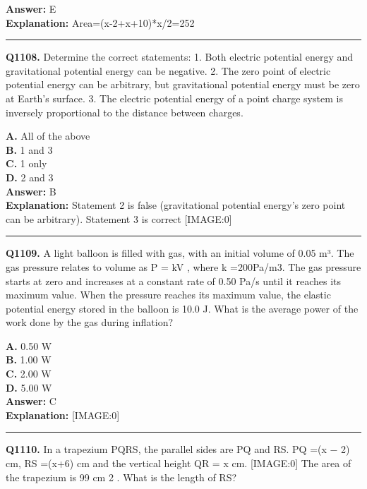 \documentclass[12pt]{article}
\begin{document}
\textbf{Answer:} E \\
\textbf{Explanation:} Area=(x-2+x+10)*x/2=252

\hrule
\vspace{1em}


\noindent
\textbf{Q1108.} Determine the correct statements:
1.
Both electric potential energy and gravitational potential energy can be negative.
2.
The zero point of electric potential energy can be arbitrary, but gravitational potential energy must be zero at Earth’s surface.
3. The electric potential energy of a point charge system is inversely proportional to the distance between charges.



\textbf{A.} All of the above \\
\textbf{B.} 1 and 3 \\
\textbf{C.} 1 only \\
\textbf{D.} 2 and 3 \\

\textbf{Answer:} B \\
\textbf{Explanation:} Statement 2 is false (gravitational potential energy’s zero point can be arbitrary). Statement 3 is correct
[IMAGE:0]

\hrule
\vspace{1em}


\noindent
\textbf{Q1109.} A light balloon is filled with gas, with an initial volume of 0.05 m³. The gas pressure relates to volume as
P
=
kV
, where
k
=200Pa/m3. The gas pressure starts at zero and increases at a constant rate of 0.50 Pa/s until it reaches its maximum value. When the pressure reaches its maximum value, the elastic potential energy stored in the balloon is 10.0 J. What is the average power of the work done by the gas during inflation?



\textbf{A.} 0.50 W \\
\textbf{B.} 1.00 W \\
\textbf{C.} 2.00 W \\
\textbf{D.} 5.00 W \\

\textbf{Answer:} C \\
\textbf{Explanation:} [IMAGE:0]

\hrule
\vspace{1em}


\noindent
\textbf{Q1110.} In a trapezium PQRS, the parallel sides are PQ and RS. PQ =(x
−
2) cm, RS =(x+6) cm and the vertical height QR = x cm.
[IMAGE:0]
The area of the trapezium is 99 cm
2
. What is the length of RS?
\end{document}
